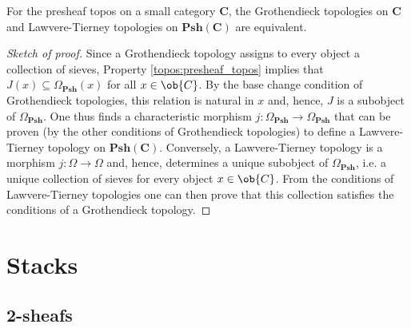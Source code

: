 
    \begin{property}
        For the presheaf topos on a small category $\mathbf{C}$, the Grothendieck topologies on $\mathbf{C}$ and Lawvere-Tierney topologies on $\mathbf{Psh(C)}$ are equivalent.
        \begin{proof}[Sketch of proof]
            Since a Grothendieck topology assigns to every object a collection of sieves, Property \ref{topos:presheaf_topos} implies that $J(x)\subseteq\Omega_\mathbf{Psh}(x)$ for all $x\in\ob{C}$. By the base change condition of Grothendieck topologies, this relation is natural in $x$ and, hence, $J$ is a subobject of $\Omega_\mathbf{Psh}$. One thus finds a characteristic morphism $j:\Omega_\mathbf{Psh}\rightarrow\Omega_\mathbf{Psh}$ that can be proven (by the other conditions of Grothendieck topologies) to define a Lawvere-Tierney topology on $\mathbf{Psh(C)}$. Conversely, a Lawvere-Tierney topology is a morphism $j:\Omega\rightarrow\Omega$ and, hence, determines a unique subobject of $\Omega_\mathbf{Psh}$, i.e. a unique collection of sieves for every object $x\in\ob{C}$. From the conditions of Lawvere-Tierney topologies one can then prove that this collection satisfies the conditions of a Grothendieck topology.
        \end{proof}
    \end{property}

\section{Stacks}
\subsection{2-sheafs}


